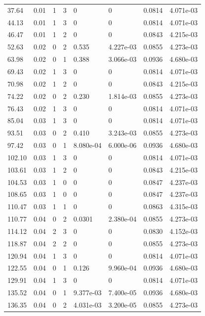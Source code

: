 \documentclass[preview]{standalone}
\begin{document}
{{\begin{tabular}{L{1.2cm}C{1.2cm} C{0.3cm}C{0.5cm} C{1.4cm}C{1.4cm} C{1.4cm}C{1.4cm}}
  37.64  &  0.01  & 1     &  3 &  0  & 0  & 0.0814 &  4.071e-03   \\ 
  44.13  &  0.01  & 1     &  3 &  0  & 0  & 0.0814 &  4.071e-03   \\ 
  46.47  &  0.01  & 1     &  2 &  0  & 0  & 0.0843 &  4.215e-03   \\ 
  52.63  &  0.02  & 0     &  2 &  0.535  & 4.227e-03  & 0.0855 &  4.273e-03   \\ 
  63.98  &  0.02  & 0     &  1 &  0.388  & 3.066e-03  & 0.0936 &  4.680e-03   \\ 
  69.43  &  0.02  & 1     &  3 &  0  & 0  & 0.0814 &  4.071e-03   \\ 
  70.98  &  0.02  & 1     &  2 &  0  & 0  & 0.0843 &  4.215e-03   \\ 
  74.22  &  0.02  & 0     &  2 &  0.230  & 1.814e-03  & 0.0855 &  4.273e-03   \\ 
  76.43  &  0.02  & 1     &  3 &  0  & 0  & 0.0814 &  4.071e-03   \\ 
  85.04  &  0.03  & 1     &  3 &  0  & 0  & 0.0814 &  4.071e-03   \\ 
  93.51  &  0.03  & 0     &  2 &  0.410  & 3.243e-03  & 0.0855 &  4.273e-03   \\ 
  97.42  &  0.03  & 0     &  1 &  8.080e-04  & 6.000e-06  & 0.0936 &  4.680e-03   \\ 
  102.10  &  0.03  & 1     &  3 &  0  & 0  & 0.0814 &  4.071e-03   \\ 
  103.61  &  0.03  & 1     &  2 &  0  & 0  & 0.0843 &  4.215e-03   \\ 
  104.53  &  0.03  & 1     &  0 &  0  & 0  & 0.0847 &  4.237e-03   \\ 
  108.65  &  0.03  & 1     &  0 &  0  & 0  & 0.0847 &  4.237e-03   \\ 
  110.47  &  0.03  & 1     &  1 &  0  & 0  & 0.0863 &  4.315e-03   \\ 
  110.77  &  0.04  & 0     &  2 &  0.0301  & 2.380e-04  & 0.0855 &  4.273e-03   \\ 
  114.12  &  0.04  & 2     &  3 &  0  & 0  & 0.0830 &  4.152e-03   \\ 
  118.87  &  0.04  & 2     &  2 &  0  & 0  & 0.0855 &  4.273e-03   \\ 
  120.94  &  0.04  & 1     &  3 &  0  & 0  & 0.0814 &  4.071e-03   \\ 
  122.55  &  0.04  & 0     &  1 &  0.126  & 9.960e-04  & 0.0936 &  4.680e-03   \\ 
  129.91  &  0.04  & 1     &  3 &  0  & 0  & 0.0814 &  4.071e-03   \\ 
  135.52  &  0.04  & 0     &  1 &  9.377e-03  & 7.400e-05  & 0.0936 &  4.680e-03   \\ 
  136.35  &  0.04  & 0     &  2 &  4.031e-03  & 3.200e-05  & 0.0855 &  4.273e-03   \\ 
\hline 
\end{tabular} 

}}
\end{document}
